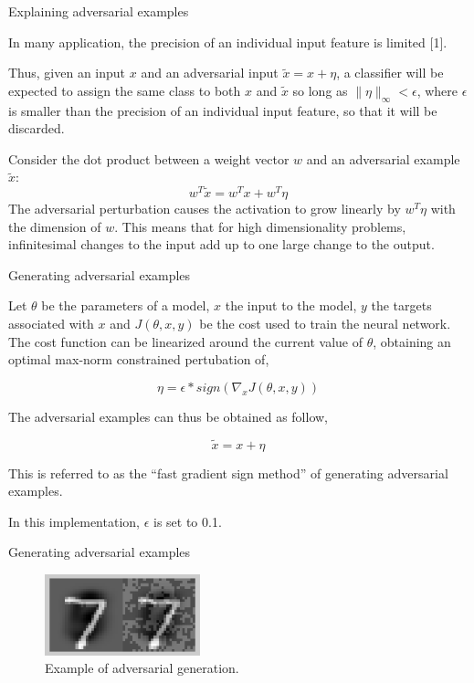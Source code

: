\begin{tframe}{Explaining adversarial examples}

In many application, the precision of an individual input feature is limited [1].

\vspace{0.1in}

Thus, given an input $ x $ and an adversarial input $ \tilde{x} = x + \eta $, a classifier will be expected to assign the same class to both $x$ and $\tilde{x}$ so long as $ \parallel \eta \parallel_\infty < \epsilon $, where $\epsilon$ is smaller than the precision of an individual input feature, so that it will be discarded.

\vspace{0.1in}

Consider the dot product between a weight vector $w$ and an adversarial example $\tilde{x}$:
$$ w^{T}\tilde{x} = w^{T}x + w^{T}\eta $$
The adversarial perturbation causes the activation to grow linearly by $w^{T}\eta$ with the dimension of $w$. This means that for high dimensionality problems, infinitesimal changes to the input add up to one large change to the output.

\end{tframe}


\begin{tframe}{Generating adversarial examples}

Let $\theta$ be the parameters of a model, $x$ the input to the model, $y$ the targets associated with $x$ and $J(\theta, x, y)$ be the cost used to train the neural network. 
The cost function can be linearized around the current value of $\theta$, obtaining an optimal max-norm constrained pertubation of,

$$ \eta = \epsilon * sign(\nabla_x J(\theta, x, y)) $$

The adversarial examples can thus be obtained as follow,

$$ \tilde{x} = x + \eta $$

This is referred to as the “fast gradient sign method” of generating adversarial examples.

\vspace{0.1in}

In this implementation, $\epsilon$ is set to 0.1.


\end{tframe}


\begin{tframe}{Generating adversarial examples}

\vspace{0.1in}
\vspace{0.1in}
\vspace{0.1in}

\begin{figure}
  \includegraphics[width=0.4\textwidth]{img/clean-adv.png}
  \caption{Example of adversarial generation.}
\end{figure}

\end{tframe}